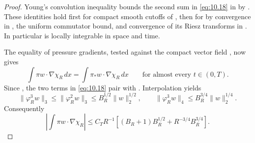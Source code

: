 \begin{proof}
%
Young's convolution inequality bounds the second sum in \eqref{eq:10.18} in
 by . These identities
hold first for compact smooth cutoffs of , then for
 by convergence in , the uniform
commutator bound, and convergence of its Riesz transforms in
. In particular  is locally
integrable in space and time.

The equality of pressure gradients, tested against the compact vector field
, now gives
\[
  \int\pi w\cdot\nabla\chi_R\,dx
  =\int\pi_*w\cdot\nabla\chi_R\,dx
  \qquad\text{for almost every }t\in(0,T).
\]
Since , the two terms in
\eqref{eq:10.18} pair with .
Interpolation yields
\[
  \|\varphi_R^3w\|_3\leq\|\varphi_R^2w\|_3
  \leq B_R^{1/2}\|w\|_2^{1/2},
  \qquad
  \|\varphi_R^3w\|_4\leq B_R^{3/4}\|w\|_2^{1/4}.
\]
Consequently
\begin{equation}
  \left|\int\pi w\cdot\nabla\chi_R\right|
  \leq C_TR^{-1}\left[(B_R+1)B_R^{1/2}+R^{-3/4}B_R^{3/4}\right].
\tag{10.19}\label{eq:10.19}
\end{equation}


\end{proof}
